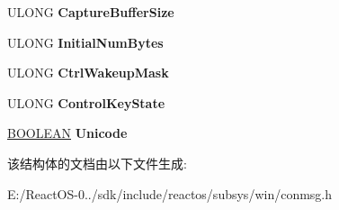 \begin{DoxyCompactItemize}
U\+L\+O\+NG {\bfseries Capture\+Buffer\+Size}
\item 
\mbox{\label{struct___c_o_n_s_o_l_e___r_e_a_d_c_o_n_s_o_l_e_affde85698c07b20a7820f6e406571f6c}} 
U\+L\+O\+NG {\bfseries Initial\+Num\+Bytes}
\item 
\mbox{\label{struct___c_o_n_s_o_l_e___r_e_a_d_c_o_n_s_o_l_e_a0ddd47cca041e4c463c2cac80d1c8407}} 
U\+L\+O\+NG {\bfseries Ctrl\+Wakeup\+Mask}
\item 
\mbox{\label{struct___c_o_n_s_o_l_e___r_e_a_d_c_o_n_s_o_l_e_a3ab49c72af70e7a27ba79a4d1fbe1b7a}} 
U\+L\+O\+NG {\bfseries Control\+Key\+State}
\item 
\mbox{\label{struct___c_o_n_s_o_l_e___r_e_a_d_c_o_n_s_o_l_e_a5a57c49af9bb76fd57112663f0eadee2}} 
\hyperlink{_processor_bind_8h_a112e3146cb38b6ee95e64d85842e380a}{B\+O\+O\+L\+E\+AN} {\bfseries Unicode}
\end{DoxyCompactItemize}


该结构体的文档由以下文件生成\+:\begin{DoxyCompactItemize}
\item 
E\+:/\+React\+O\+S-\/0../sdk/include/reactos/subsys/win/conmsg.\+h\end{DoxyCompactItemize}
